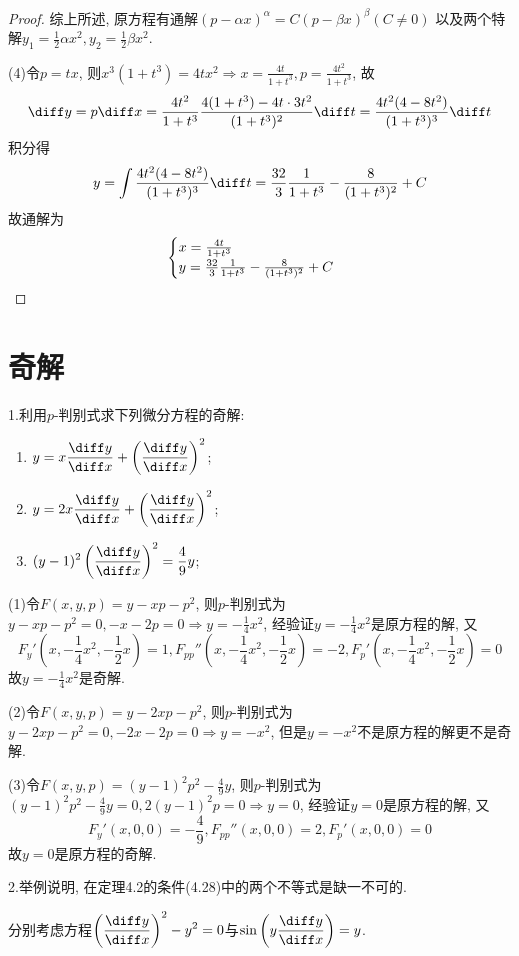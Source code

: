 \begin{proof}
综上所述, 原方程有通解$(p-\alpha x)^{\alpha}=C(p-\beta x)^{\beta}(C\neq0)$
以及两个特解$y_1=\frac{1}{2}\alpha x^2,y_2=\frac{1}{2}\beta x^2$.

(4)令$p=tx$, 则$x^3(1+t^3)=4tx^2\Rightarrow x=\frac{4t}{1+t^3},p=\frac{4t^2}{1+t^3}$, 故
\[\diff y=p\diff x=\frac{4t^2}{1+t^3}\frac{4(1+t^3)-4t\cdot3t^2}{(1+t^3)^2}\diff t=\frac{4t^2(4-8t^2)}{(1+t^3)^3}\diff t\]
积分得
\[y=\int\frac{4t^2(4-8t^2)}{(1+t^3)^3}\diff t=\frac{32}{3}\frac{1}{1+t^3}-\frac{8}{(1+t^3)^2}+C\]
故通解为\[\begin{cases}
x=\frac{4t}{1+t^3}\\y=\frac{32}{3}\frac{1}{1+t^3}-\frac{8}{(1+t^3)^2}+C
\end{cases}\qedhere\]
\end{proof}


\section{奇解}


1.利用$p$-判别式求下列微分方程的奇解:
\begin{enumerate}[(1)]
\item $\displaystyle y=x\frac{\diff y}{\diff x}+\left(\frac{\diff y}{\diff x}\right)^2$;
\item $\displaystyle y=2x\frac{\diff y}{\diff x}+\left(\frac{\diff y}{\diff x}\right)^2$;
\item $\displaystyle (y-1)^2\left(\frac{\diff y}{\diff x}\right)^2=\frac{4}{9}y$;
\end{enumerate}

\begin{solve} 
(1)令$F(x,y,p)=y-xp-p^2$, 则$p$-判别式为$y-xp-p^2=0,-x-2p=0\Rightarrow y=-\frac{1}{4}x^2$, 经验证$y=-\frac{1}{4}x^2$是原方程的解, 又
\[F_y'\left(x,-\frac{1}{4}x^2,-\frac{1}{2}x\right)=1,F_{pp}''\left(x,-\frac{1}{4}x^2,-\frac{1}{2}x\right)=-2,F_p'\left(x,-\frac{1}{4}x^2,-\frac{1}{2}x\right)=0\]
故$y=-\frac{1}{4}x^2$是奇解.

(2)令$F(x,y,p)=y-2xp-p^2$, 则$p$-判别式为$y-2xp-p^2=0,-2x-2p=0\Rightarrow y=-x^2$, 但是$y=-x^2$不是原方程的解更不是奇解.

(3)令$F(x,y,p)=(y-1)^2p^2-\frac{4}{9}y$, 则$p$-判别式为$(y-1)^2p^2-\frac{4}{9}y=0,2(y-1)^2p=0\Rightarrow y=0$, 经验证$y=0$是原方程的解, 又
\[F_y'(x,0,0)=-\frac{4}{9},F_{pp}''(x,0,0)=2,F_p'(x,0,0)=0\]
故$y=0$是原方程的奇解.
\end{solve}


2.举例说明, 在定理4.2的条件(4.28)中的两个不等式是缺一不可的.
\begin{solve}  
分别考虑方程$\displaystyle\left(\frac{\diff y}{\diff x}\right)^2-y^2=0$与$\displaystyle\sin\left(y\frac{\diff y}{\diff x}\right)=y$.
\end{solve}


